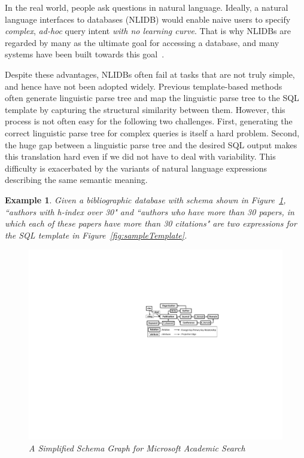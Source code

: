 \documentclass{vldb}
\newtheorem{example}{Example}
\begin{document}
In the real world, people ask questions in natural language.  Ideally, a natural language interfaces to databases (NLIDB) would enable naive users to specify \emph{complex}, \emph{ad-hoc} query intent \emph{with no learning curve}.  That is why NLIDBs are regarded by many as the ultimate goal for accessing a database, and many systems have been built towards this goal~\cite{DBLP:journals/nle/AndroutsopoulosRT95,DBLP:conf/iui/PopescuEK03,DBLP:journals/tods/LiYJ07,DBLP:conf/vldb/Minock07,DBLP:journals/pvldb/LiJ14,DBLP:conf/acl/DongL16,DBLP:journals/debu/LuLK16,DBLP:journals/cacm/Liang16,DBLP:journals/tacl/ReddyTCKDSL16}.

Despite these advantages, NLIDBs often fail at tasks that are not truly simple, and hence have not been adopted widely. Previous template-based methods~\cite{DBLP:conf/sigmod/ZhengZLYSZ15,DBLP:tbnalir} often generate linguistic parse tree and map the linguistic parse tree to the SQL template by capturing the structural similarity between them.  However, this process is not often easy for the following two challenges.  First, generating the correct linguistic parse tree for complex queries is itself a hard problem.  Second, the huge gap between a linguistic parse tree and the desired SQL output makes this translation hard even if we did not have to deal with variability.  This difficulty is exacerbated by the variants of natural language expressions describing the same semantic meaning.  

\begin{example}
\label{example:30}
Given a bibliographic database with schema shown in Figure~\ref{fig:runningExample}, ``authors with h-index over 30" and ``authors who have more than 30 papers, in which each of these papers have more than 30 citations" are two expressions for the SQL template in Figure~\ref{fig:sampleTemplate}.  
\begin{figure}
  \center
  \includegraphics[width=1\linewidth]{pic/runningExample.pdf}
  \caption{A Simplified Schema Graph for Microsoft Academic Search}
  \label{fig:runningExample}
\end{figure}
\end{example}
\end{document}
